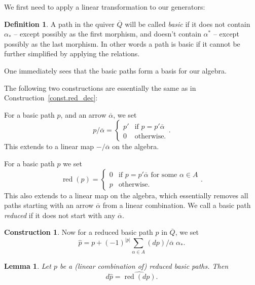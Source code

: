 \documentclass[a4paper,11pt]{amsart}
\newtheorem{lemma}[theorem]{Lemma}
\theoremstyle{definition}
\newtheorem{construction}[theorem]{Construction}
\newtheorem{definition}[theorem]{Definition}
\DeclareMathOperator{\red}{red}
\numberwithin{theorem}{section}
\begin{document}
We first need to apply a linear transformation to our generators:

\begin{definition}
A path in the quiver $\overline{Q}$ will be called \emph{basic} if it does not contain $\alpha_*$ -- except possibly as the first morphism, and doesn't contain $\alpha^*$ -- except possibly as the last morphism. In other words a path is basic if it cannot be further simplified by applying the relations.

One immediately sees that the basic paths form a basis for our algebra.

\medskip
The following two constructions are essentially the same as in Construction~\ref{const.red_dec}:

For a basic path $p$, and an arrow $\overline{\alpha}$, we set
\[ p / \overline{\alpha} = \begin{cases} p' & \text{if } p = p' \overline{\alpha} \\ 0 & \text{otherwise.} \end{cases}. \]
This extends to a linear map $- / \overline{\alpha}$ on the algebra.

For a basic path $p$ we set
\[ \red(p) = \begin{cases} 0 & \text{if } p = p' \overline{\alpha} \text{ for some } \alpha \in A \\ p & \text{otherwise.} \end{cases}. \]
This also extends to a linear map on the algebra, which essentially removes all paths starting with an arrow $\overline{\alpha}$ from a linear combination. We call a basic path \emph{reduced} if it does not start with any $\overline{\alpha}$.
\end{definition}

\begin{construction} \label{const.hat}
Now for a reduced basic path $p$ in $\overline{Q}$, we set
\[ \widehat{p} = p + (-1)^{|p|} \sum_{\alpha \in A} ( dp ) / \overline{\alpha} \; \alpha_*. \]
\end{construction}

\begin{lemma} \label{lem.reduction_preserves_diff}
Let $p$ be a (linear combination of) reduced basic paths. Then
\[ d \widehat{p} = \widehat{\red(dp)}. \]
\end{lemma}
\end{document}
